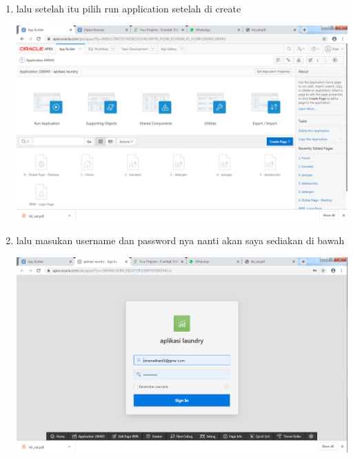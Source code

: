 \documentclass{article}
\begin{document}
\begin{enumerate}
\item lalu setelah itu pilih run application setelah di create 
    \begin{center}
         \centering
            \includegraphics[scale=0.27]{gambar/Capture15.PNG}
        \caption{}
        \label{excel}
    \end{center} 
    
\item lalu masukan username dan password nya nanti akan saya sediakan di bawah 
    \begin{center}
         \centering
            \includegraphics[scale=0.27]{gambar/Capture16.PNG}
        \caption{}
        \label{excel}
    \end{center} 
    

\end{enumerate}
\end{document}
